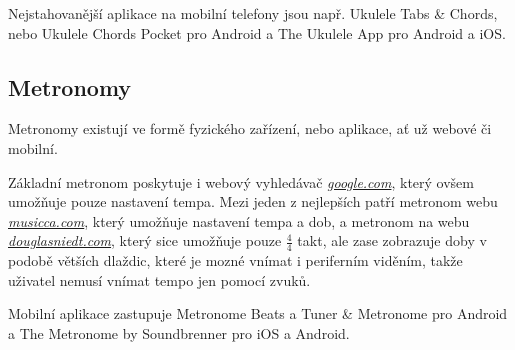 Nejstahovanější aplikace na mobilní telefony jsou např. Ukulele Tabs \& Chords, nebo Ukulele Chords Pocket pro Android a The Ukulele App pro Android a iOS.

\subsection{Metronomy}
\label{ss:metronomes}
Metronomy existují ve formě fyzického zařízení, nebo aplikace, ať už webové či mobilní.

Základní metronom poskytuje i webový vyhledávač \href{www.google.com}{\emph{google.com}}, který ovšem umožňuje pouze nastavení tempa. Mezi jeden z nejlepších patří metronom webu \href{www.musicca.com}{\emph{musicca.com}}, který umožňuje nastavení tempa a dob, a metronom na webu \href{www.douglasniedt.com}{\emph{douglasniedt.com}}, který sice umožňuje pouze $ \frac{4}{4} $ takt, ale zase zobrazuje doby v podobě větších dlaždic, které je mozné vnímat i periferním viděním, takže uživatel nemusí vnímat tempo jen pomocí zvuků.

Mobilní aplikace zastupuje Metronome Beats a Tuner \& Metronome pro Android a The Metronome by Soundbrenner pro iOS a Android.
